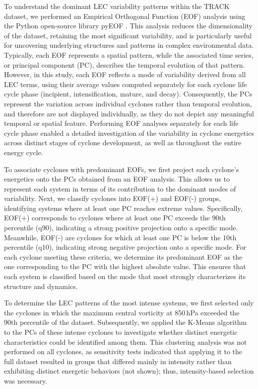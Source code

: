 \documentclass[pdflatex,sn-chicago]{sn-jnl}%
\theoremstyle{plain}
\theoremstyle{definition}
\theoremstyle{remark}
\theoremstyle{definition}
\begin{document}
To understand the dominant LEC variability patterns within the TRACK dataset, we performed an Empirical Orthogonal Function (EOF) analysis \citep{fukuoka1951study, lorenz1956empirical} using the Python open-source library pyEOF \citep{zheng_2021}. This analysis reduces the dimensionality of the dataset, retaining the most significant variability, and is particularly useful for uncovering underlying structures and patterns in complex environmental data. Typically, each EOF represents a spatial pattern, while the associated time series, or principal component (PC), describes the temporal evolution of that pattern. However, in this study, each EOF reflects a mode of variability derived from all LEC terms, using their average values computed separately for each cyclone life cycle phase (incipient, intensification, mature, and decay). Consequently, the PCs represent the variation across individual cyclones rather than temporal evolution, and therefore are not displayed individually, as they do not depict any meaningful temporal or spatial feature. Performing EOF analyses separately for each life cycle phase enabled a detailed investigation of the variability in cyclone energetics across distinct stages of cyclone development, as well as throughout the entire energy cycle.


To associate cyclones with predominant EOFs, we first project each cyclone's energetics onto the PCs obtained from an EOF analysis. This allows us to represent each system in terms of its contribution to the dominant modes of variability. Next, we classify cyclones into EOF(+) and EOF(-) groups, identifying systems where at least one PC reaches extreme values. Specifically, EOF(+) corresponds to cyclones where at least one PC exceeds the 90th percentile (q90), indicating a strong positive projection onto a specific mode. Meanwhile, EOF(-) are  cyclones for which at least one PC is below the 10th percentile (q10), indicating strong negative projection onto a specific mode. For each cyclone meeting these criteria, we determine its predominant EOF as the one corresponding to the PC with the highest absolute value. This ensures that each system is classified based on the mode that most strongly characterizes its structure and dynamics.

To determine the LEC patterns of the most intense systems, we first selected only the cyclones in which the maximum central vorticity at 850\,hPa exceeded the 90th percentile of the dataset. Subsequently, we applied the K-Means algorithm to the PCs of these intense cyclones to investigate whether distinct energetic characteristics could be identified among them. This clustering analysis was not performed on all cyclones, as sensitivity tests indicated that applying it to the full dataset resulted in groups that differed mainly in intensity rather than exhibiting distinct energetic behaviors (not shown); thus, intensity-based selection was necessary. 
\end{document}

